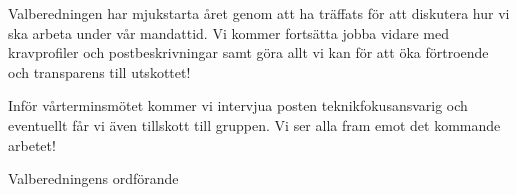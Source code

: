 \documentclass[../_main/handlingar.tex]{subfiles}
\begin{document}
Valberedningen har mjukstarta året genom att ha träffats för att diskutera hur vi ska arbeta under vår mandattid. Vi kommer fortsätta jobba vidare med kravprofiler och postbeskrivningar samt göra allt vi kan för att öka förtroende och transparens till utskottet! 

Inför vårterminsmötet kommer vi intervjua posten teknikfokusansvarig och eventuellt får vi även tillskott till gruppen. Vi ser alla fram emot det kommande arbetet!

\begin{signatures}{1}
    \mvh
    \signature{Axel Voss}{Valberedningens ordförande}
\end{signatures}
\end{document}
